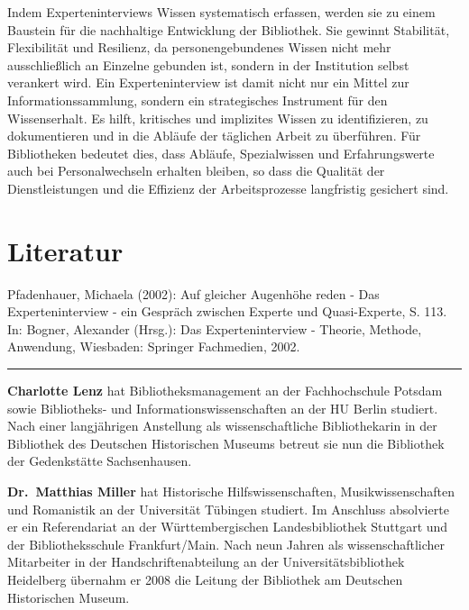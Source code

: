 \documentclass[a4paper,
fontsize=11pt,
oneside,
numbers=noperiodatend,
parskip=half-,
bibliography=totoc,
final
]{scrartcl}
\begin{document}
Indem Experteninterviews Wissen systematisch erfassen, werden sie zu
einem Baustein für die nachhaltige Entwicklung der Bibliothek. Sie
gewinnt Stabilität, Flexibilität und Resilienz, da personengebundenes
Wissen nicht mehr ausschließlich an Einzelne gebunden ist, sondern in
der Institution selbst verankert wird. Ein Experteninterview ist damit
nicht nur ein Mittel zur Informationssammlung, sondern ein strategisches
Instrument für den Wissenserhalt. Es hilft, kritisches und implizites
Wissen zu identifizieren, zu dokumentieren und in die Abläufe der
täglichen Arbeit zu überführen. Für Bibliotheken bedeutet dies, dass
Abläufe, Spezialwissen und Erfahrungswerte auch bei Personalwechseln
erhalten bleiben, so dass die Qualität der Dienstleistungen und die
Effizienz der Arbeitsprozesse langfristig gesichert sind.

\section{Literatur}\label{literatur}

Pfadenhauer, Michaela (2002): Auf gleicher Augenhöhe reden - Das
Experteninterview - ein Gespräch zwischen Experte und Quasi-Experte, S.
113. In: Bogner, Alexander (Hrsg.): Das Experteninterview - Theorie,
Methode, Anwendung, Wiesbaden: Springer Fachmedien, 2002.

\begin{center}\rule{0.5\linewidth}{0.5pt}\end{center}

\textbf{Charlotte Lenz} hat
Bibliotheksmanagement an der Fachhochschule Potsdam sowie Bibliotheks-
und Informationswissenschaften an der HU Berlin studiert. Nach einer
langjährigen Anstellung als wissenschaftliche Bibliothekarin in der
Bibliothek des Deutschen Historischen Museums betreut sie nun die
Bibliothek der Gedenkstätte Sachsenhausen.

\textbf{Dr.~Matthias Miller} hat Historische Hilfswissenschaften,
Musikwissenschaften und Romanistik an der Universität Tübingen studiert.
Im Anschluss absolvierte er ein Referendariat an der Württembergischen
Landesbibliothek Stuttgart und der Bibliotheksschule Frankfurt/Main.
Nach \linebreak neun Jahren als wissenschaftlicher Mitarbeiter in der
Handschriftenabteilung an der Universitätsbibliothek Heidelberg übernahm
er 2008 die Leitung der Bibliothek am Deutschen Historischen Museum.
\end{document}
